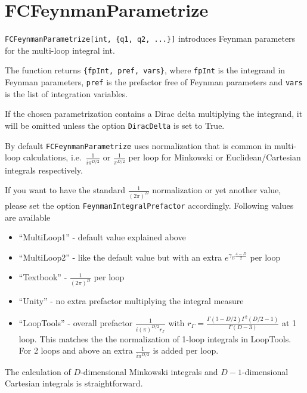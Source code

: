 \documentclass[../FeynCalcManual.tex]{subfiles}
\begin{document}
\hypertarget{fcfeynmanparametrize}{
\section{FCFeynmanParametrize}\label{fcfeynmanparametrize}}

\texttt{FCFeynmanParametrize[\allowbreak{}int,\ \allowbreak{}\{\allowbreak{}q1,\ \allowbreak{}q2,\ \allowbreak{}...\}]}
introduces Feynman parameters for the multi-loop integral int.

The function returns
\texttt{\{\allowbreak{}fpInt,\ \allowbreak{}pref,\ \allowbreak{}vars\}},
where \texttt{fpInt} is the integrand in Feynman parameters,
\texttt{pref} is the prefactor free of Feynman parameters and
\texttt{vars} is the list of integration variables.

If the chosen parametrization contains a Dirac delta multiplying the
integrand, it will be omitted unless the option \texttt{DiracDelta} is
set to True.

By default \texttt{FCFeynmanParametrize} uses normalization that is
common in multi-loop calculations, i.e.~\(\frac{1}{i \pi^{D/2}}\) or
\(\frac{1}{\pi^{D/2}}\) per loop for Minkowski or Euclidean/Cartesian
integrals respectively.

If you want to have the standard \(\frac{1}{(2 \pi)^D}\) normalization
or yet another value, please set the option
\texttt{FeynmanIntegralPrefactor} accordingly. Following values are
available

\begin{itemize}
\tightlist
\item
  ``MultiLoop1'' - default value explained above
\item
  ``MultiLoop2'' - like the default value but with an extra
  \(e^{\gamma_E \frac{4-D}{2}}\) per loop
\item
  ``Textbook'' - \(\frac{1}{(2 \pi)^D}\) per loop
\item
  ``Unity'' - no extra prefactor multiplying the integral measure
\item
  ``LoopTools'' - overall prefactor
  \(\frac{1}{i (\pi)^{D/2} r_{\Gamma}}\) with
  \(r_{\Gamma} = \frac{\Gamma(3-D/2) \Gamma^2 (D/2-1)}{\Gamma(D-3)}\) at
  1 loop. This matches the the normalization of 1-loop integrals in
  LoopTools. For 2 loops and above an extra \(\frac{1}{i \pi^{D/2}}\) is
  added per loop.
\end{itemize}

The calculation of \(D\)-dimensional Minkowski integrals and
\(D-1\)-dimensional Cartesian integrals is straightforward.
\end{document}
